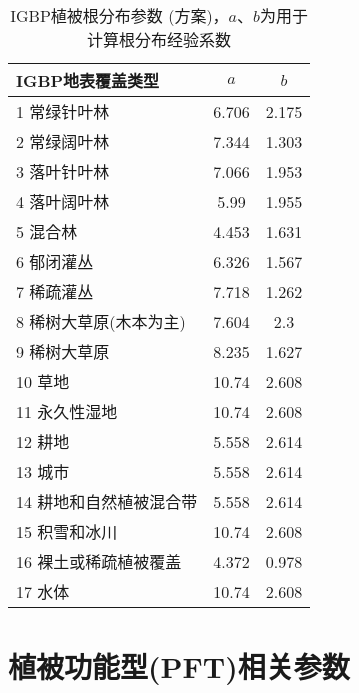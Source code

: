 \begin{table}[htbp]
  \centering
  \caption[IGBP植被根分布参数 (\citet{zeng2001global}方案)]{IGBP植被根分布参数 (\citet{zeng2001global}方案)，$a$、$b$为用于计算根分布经验系数}
  \label{tab:IGBP植被根分布参数zeng方案}
  \begin{tabular}{@{}lcc@{}}
    \toprule
    IGBP地表覆盖类型        & $a$   & $b$   \\ \midrule
    1 常绿针叶林            & 6.706 & 2.175 \\
    2 常绿阔叶林            & 7.344 & 1.303 \\
    3 落叶针叶林            & 7.066 & 1.953 \\
    4 落叶阔叶林            & 5.99  & 1.955 \\
    5 混合林                & 4.453 & 1.631 \\
    6 郁闭灌丛              & 6.326 & 1.567 \\
    7 稀疏灌丛              & 7.718 & 1.262 \\
    8 稀树大草原(木本为主)  & 7.604 & 2.3   \\
    9 稀树大草原            & 8.235 & 1.627 \\
    10 草地                 & 10.74 & 2.608 \\
    11 永久性湿地           & 10.74 & 2.608 \\
    12 耕地                 & 5.558 & 2.614 \\
    13 城市                 & 5.558 & 2.614 \\
    14 耕地和自然植被混合带 & 5.558 & 2.614 \\
    15 积雪和冰川           & 10.74 & 2.608 \\
    16 裸土或稀疏植被覆盖   & 4.372 & 0.978 \\
    17 水体                 & 10.74 & 2.608 \\ \bottomrule
  \end{tabular}
\end{table}


\chapter{植被功能型(PFT)相关参数}\label{植被功能型PFT相关参数}

